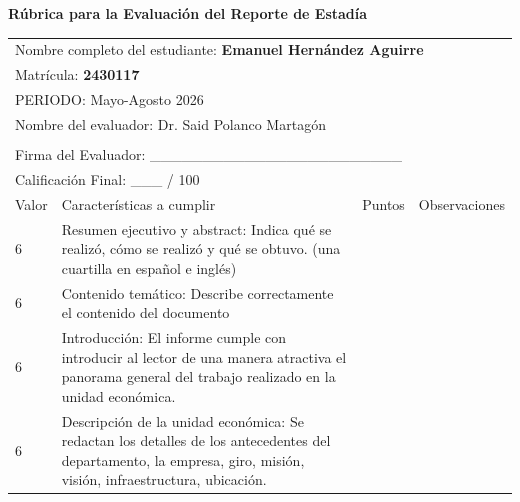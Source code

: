 \documentclass[12pt]{article}
\newcommand{\NombreAlumno}{Emanuel Hernández Aguirre}
\newcommand{\nasesorinstitucional}{Dr. Said Polanco Martagón}
\newcommand{\Matricula}           {2430117}  %
\newcommand{\ncuatrimestre}{Mayo-Agosto 2026}
\newcommand{\fechaAutorizacionInforme}               {31 de Julio de 2026}
\begin{document}
\clearpage
\newcommand{\SizeFont}{\footnotesize}

\begin{center}
\large {\textbf{Rúbrica para la Evaluación del Reporte de Estadía}}

\begin{table}
\begin{longtable}{|p{0.5cm}|p{13cm}|p{1.5cm}|p{3cm}|}
\hline
\multicolumn{4}{|l|}{Nombre completo del estudiante: \textbf{\NombreAlumno} }\\
\multicolumn{4}{|l|}{Matrícula:  \textbf{\Matricula}}  \\
\multicolumn{4}{|l|}{PERIODO: \ncuatrimestre } \\
\multicolumn{4}{|l|}{Nombre del evaluador: \nasesorinstitucional} \\
\multicolumn{4}{|l|}{ } \\
\multicolumn{4}{|l|}{Firma del Evaluador: \_\_\_\_\_\_\_\_\_\_\_\_\_\_\_\_\_\_\_\_\_\_\_\_  }\\
\multicolumn{4}{|l|}{Calificación Final: \_\_\_ / 100} \\ \hline
Valor & Características a cumplir & Puntos & Observaciones \\ \hline
\SizeFont 6 & \SizeFont Resumen ejecutivo y abstract: Indica qué se realizó, cómo se realizó y qué se obtuvo. (una cuartilla en español e inglés) & & \\ \hline
\SizeFont 6 & \SizeFont Contenido temático: Describe correctamente el contenido del documento & & \\ \hline
\SizeFont 6 & \SizeFont Introducción: El informe cumple con introducir al lector de una manera atractiva el panorama general del trabajo realizado en la unidad económica.  & & \\ \hline
\SizeFont 6 & \SizeFont Descripción de la unidad económica: Se redactan los detalles de los antecedentes del departamento, la empresa, giro, misión, visión, infraestructura, ubicación. & & \\\hline

\end{longtable}
\end{table}
\end{center}
\end{document}
